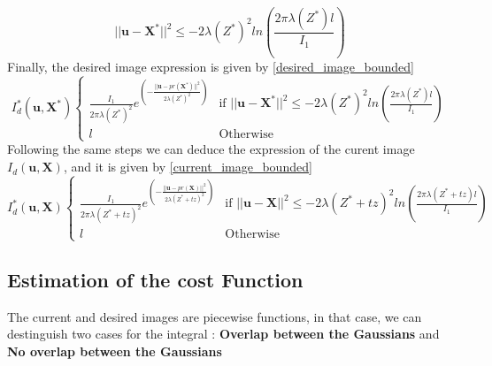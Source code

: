 \begin{equation}
    ||\textbf{u}-\textbf{X}^{*}||^{2} \leq -2\lambda(Z^{*})^{2} ln\left(\frac{2\pi\lambda(Z^{*})l}{I_{1}}\right)
    \label{desired_image_bounded_5}
\end{equation}
Finally, the desired image expression is given by \eqref{desired_image_bounded}
\begin{equation}
    I_{d}^{*}(\textbf{u}, \textbf{X}^{*})
    \begin{cases}
        \frac{I_{1}}{2\pi\lambda(Z^{*})^{2}} e^{\left(-\frac{||\textbf{u}-pr(\textbf{X}^{*})||^{2}}{2\lambda(Z^{*})^{2}}\right)} & \text{if } ||\textbf{u}-\textbf{X}^{*}||^{2} \leq -2\lambda(Z^{*})^{2} ln\left(\frac{2\pi\lambda(Z^{*})l}{I_{1}}\right)\\
        l & \text{Otherwise}
    \end{cases}
    \label{desired_image_bounded}
\end{equation}
Following the same steps we can deduce the expression of the curent image $I_{d}(\textbf{u}, \textbf{X})$, and it is given by \eqref{current_image_bounded}
\begin{equation}
    I_{d}^{*}(\textbf{u}, \textbf{X})
    \begin{cases}
        \frac{I_{1}}{2\pi\lambda(Z^{*}+tz)^{2}} e^{\left(-\frac{||\textbf{u}-pr(\textbf{X})||^{2}}{2\lambda(Z^{*}+tz)^{2}}\right)} & \text{if } ||\textbf{u}-\textbf{X}||^{2} \leq -2\lambda(Z^{*}+tz)^{2} ln\left(\frac{2\pi\lambda(Z^{*}+tz)l}{I_{1}}\right)\\
        l & \text{Otherwise}
    \end{cases}
    \label{current_image_bounded}
\end{equation}
\subsection{Estimation of the cost Function}
The current and desired images are piecewise functions, in that case, we can destinguish two cases for the integral : \textbf{Overlap between the Gaussians} and \textbf{No overlap between the Gaussians}
